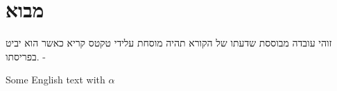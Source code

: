 \documentclass{article}
\begin{document}
\section{מבוא}
זוהי עובדה מבוססת שדעתו של הקורא תהיה מוסחת עלידי טקטס קריא כאשר הוא יביט בפריסתו.  -

\begin{english}
Some English text with $\alpha$
\end{english}
\end{document}
